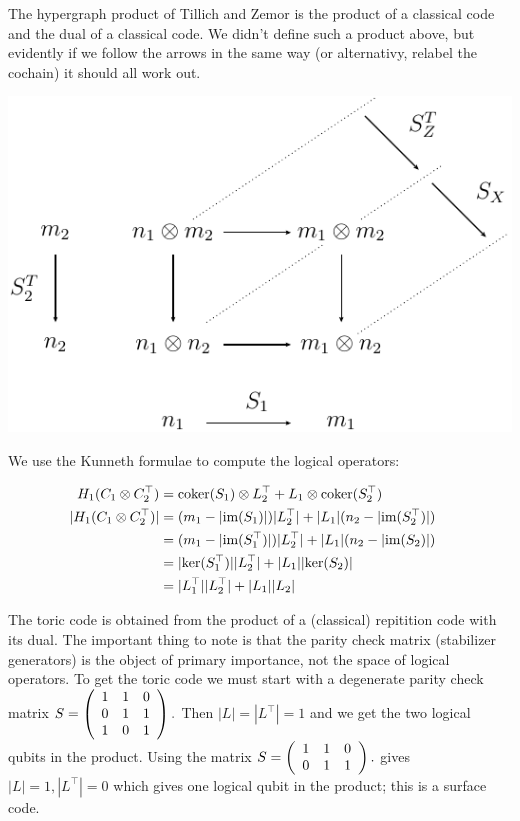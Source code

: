 The hypergraph product of Tillich and Zemor \cite{Tillich09} is the
product of a classical code and the dual of a classical code.
We didn't define such a product above, but evidently if we
follow the arrows in the same way (or alternativy,
relabel the cochain) it should all work out.

\begin{center}
\includegraphics{hyperprod.pdf}
\end{center}

We use the Kunneth formulae to compute the logical
operators:

\begin{align*}
    \H_1(C_1\otimes C_2^\top)   &= \coker(\S_1)\otimes L_2^\top + L_1 \otimes \coker(\S_2^\top) \cr
    |\H_1(C_1\otimes C_2^\top)| &= (m_1-|\im(\S_1)|)|L_2^\top| + |L_1|(n_2 - |\im(\S_2^\top)|) \cr
        &= (m_1-|\im(\S_1^\top)|)|L_2^\top| + |L_1|(n_2 - |\im(\S_2)|) \cr
        &= |\ker(\S_1^\top)||L_2^\top| + |L_1||\ker(\S_2)| \cr
        &= |L_1^\top||L_2^\top| + |L_1||L_2| \cr
\end{align*}

The toric code is obtained from the product of a
(classical) repitition code with its dual.
The important thing to note is that the parity check
matrix (stabilizer generators) is the object of primary
importance, not the space of logical operators.
To get the toric code we must start with a degenerate
parity check matrix  $
\S = \left(
\begin{array}{ccc}
1 & 1 & 0 \\
0 & 1 & 1 \\
1 & 0 & 1 \\
\end{array}
\right).$ 
Then $|L|=|L^\top|=1$ and we get the two logical
qubits in the product.
Using the matrix $
\S = \left(
\begin{array}{ccc}
1 & 1 & 0 \\
0 & 1 & 1 \\
\end{array}
\right).$ gives $|L|=1, |L^\top|=0$ which gives
one logical qubit in the product; this is a surface
code.

